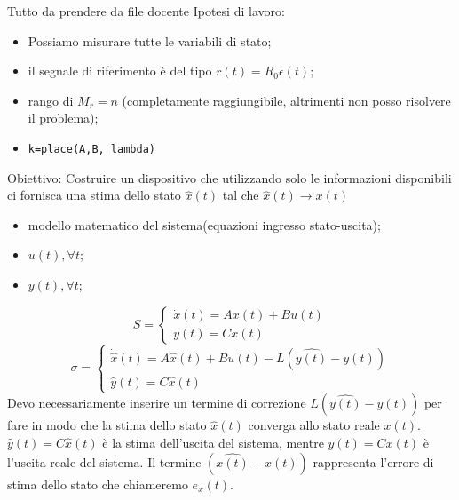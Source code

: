 \begin{tcolorbox}[title = Problema di regolazione]
    Tutto da prendere da file docente
    Ipotesi di lavoro:
    \begin{itemize}
        \item Possiamo misurare tutte le variabili di stato;
        \item il segnale di riferimento è del tipo $r(t) = R_0 \epsilon(t)$;
        \item rango di $M_r=n$ (completamente raggiungibile, altrimenti non posso risolvere
              il problema);
        \item \verb|k=place(A,B, lambda)|
    \end{itemize}
\end{tcolorbox}

\begin{tcolorbox}[title= Osservatore dello stato (stimatore assoluto dello stato)]
    Obiettivo: Costruire un dispositivo che utilizzando solo le informazioni disponibili ci fornisca una stima dello stato $\hat{x}(t)$ tal che $\hat{x}(t) \rightarrow x(t)$
    \begin{itemize}
        \item modello matematico del sistema(equazioni ingresso stato-uscita);
        \item $u(t), \forall t$;
        \item $y(t), \forall t$;
    \end{itemize}
    \begin{equation}
        S=
        \begin{cases}
            \dot{x}(t) = A x(t) + B u(t) \\
            y(t) = C x(t)
        \end{cases}
    \end{equation}
    \begin{equation}
        \sigma =
        \begin{cases}
            \dot{\hat{x}}(t) = A \hat{x}(t) + B u(t) - L (\hat{y(t)} - y(t)) \\
            \hat{y}(t) = C \hat{x}(t)
        \end{cases}
    \end{equation}
    Devo necessariamente inserire un termine di correzione $L (\hat{y(t)} - y(t))$ per fare in modo che la stima dello stato $\hat{x}(t)$ converga allo stato reale $x(t)$. $\hat{y}(t) = C \hat{x}(t)$ è la stima dell'uscita del sistema, mentre $y(t)=C x(t)$ è l'uscita reale del sistema.
    Il termine $(\hat{x(t)} - x(t))$ rappresenta l'errore di stima dello stato che chiameremo $e_x(t)$.

\end{tcolorbox}
